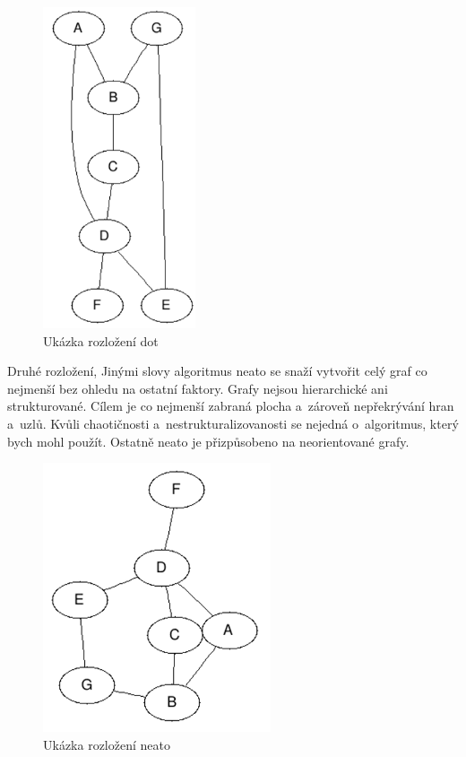 \documentclass[printed,color,table,oneside,nolot,nolof]{fithesis}
\begin{document}
\begin{figure}[h!]
	\label{fig:Ukázka rozložení dot}
	\caption{Ukázka rozložení dot}
	\centering
	\includegraphics[width=0.4\textwidth]{pictures/dot_example.png} 
\end{figure}

	Druhé rozložení, \cite{graphviz_layout}
	Jinými slovy algoritmus neato se snaží vytvořit celý graf co nejmenší bez ohledu na ostatní faktory. Grafy nejsou hierarchické ani 
	strukturované. Cílem je co nejmenší zabraná plocha a~zároveň nepřekrývání hran a~uzlů. Kvůli chaotičnosti a~nestrukturalizovanosti se nejedná o~algoritmus, který bych mohl
	použít. Ostatně neato je přizpůsobeno na neorientované grafy.

\begin{figure}[h!]
	\label{fig:Ukázka rozložení neato}
	\caption{Ukázka rozložení neato}
	\centering
	\includegraphics[width=0.6\textwidth]{pictures/neato_example.png} 
\end{figure}
\end{document}
